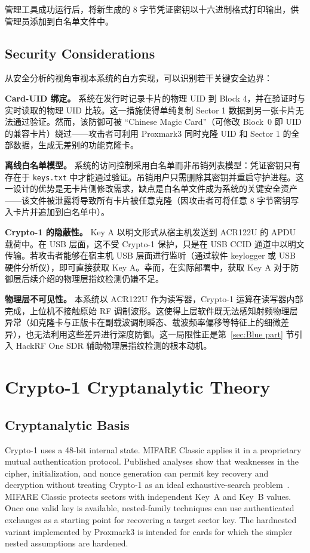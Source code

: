 \documentclass[sigconf]{acmart}
\begin{document}
管理工具成功运行后，将新生成的 8 字节凭证密钥以十六进制格式打印输出，供管理员添加到白名单文件中。

\subsection{Security Considerations}

从安全分析的视角审视本系统的白方实现，可以识别若干关键安全边界：

\textbf{Card-UID 绑定。} 系统在发行时记录卡片的物理 UID 到 Block 4，并在验证时与实时读取的物理 UID 比较。这一措施使得单纯复制 Sector 1 数据到另一张卡片无法通过验证。然而，该防御可被 ``Chinese Magic Card''（可修改 Block~0 即 UID 的兼容卡片）绕过——攻击者可利用 Proxmark3 同时克隆 UID 和 Sector 1 的全部数据，生成无差别的功能克隆卡。

\textbf{离线白名单模型。} 系统的访问控制采用白名单而非吊销列表模型：凭证密钥只有存在于 \texttt{keys.txt} 中才能通过验证。吊销用户只需删除其密钥并重启守护进程。这一设计的优势是无卡片侧修改需求，缺点是白名单文件成为系统的关键安全资产——该文件被泄露将导致所有卡片被任意克隆（因攻击者可将任意 8 字节密钥写入卡片并追加到白名单中）。

\textbf{Crypto-1 的隐蔽性。} Key A 以明文形式从宿主机发送到 ACR122U 的 APDU 载荷中。在 USB 层面，这不受 Crypto-1 保护，只是在 USB CCID 通道中以明文传输。若攻击者能够在宿主机 USB 层面进行监听（通过软件 keylogger 或 USB 硬件分析仪），即可直接获取 Key A。幸而，在实际部署中，获取 Key A 对于防御层后续介绍的物理层指纹检测仍嫌不足。

\textbf{物理层不可见性。} 本系统以 ACR122U 作为读写器，Crypto-1 运算在读写器内部完成，上位机不接触原始 RF 调制波形。这使得上层软件既无法感知射频物理层异常（如克隆卡与正版卡在副载波调制瞬态、载波频率偏移等特征上的细微差异），也无法利用这些差异进行深度防御。这一局限性正是第~\ref{sec:Blue part} 节引入 HackRF One SDR 辅助物理层指纹检测的根本动机。

\section{Crypto-1 Cryptanalytic Theory}
\label{sec:attack-theory}

\subsection{Cryptanalytic Basis}

Crypto-1 uses a 48-bit internal state. MIFARE Classic applies it in a proprietary mutual authentication protocol. Published analyses show that weaknesses in the cipher, initialization, and nonce generation can permit key recovery and decryption without treating Crypto-1 as an ideal exhaustive-search problem~\cite{garcia2008dismantling,kasper2012all}. MIFARE Classic protects sectors with independent Key~A and Key~B values. Once one valid key is available, nested-family techniques can use authenticated exchanges as a starting point for recovering a target sector key. The hardnested variant implemented by Proxmark3 is intended for cards for which the simpler nested assumptions are hardened.
\end{document}
